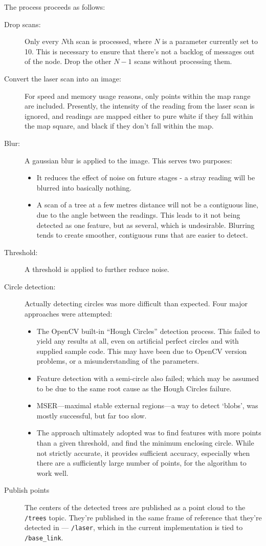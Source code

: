 \documentclass[12pt,oneside,a4paper]{book}
\begin{document}
The process proceeds as follows:
\begin{description}
\item[Drop scans:] Only every $N$th scan is processed, where $N$ is a
  parameter currently set to 10. This is necessary to ensure that
  there's not a backlog of messages out of the node. Drop the other
  $N-1$ scans without processing them.
\item[Convert the laser scan into an image:] For speed and memory usage
  reasons, only points within the map range are included. Presently,
  the intensity of the reading from the laser scan is ignored, and
  readings are mapped either to pure white if they fall within the map
  square, and black if they don't fall within the map.
\item[Blur:] A gaussian blur is applied to the image. This serves two
  purposes:
  \begin{itemize}
  \item It reduces the effect of noise on future stages - a stray
    reading will be blurred into basically nothing.
  \item A scan of a tree at a few metres distance will not be a
    contiguous line, due to the angle between the readings. This leads
    to it not being detected as one feature, but as several, which is
    undesirable. Blurring tends to create smoother, contiguous runs
    that are easier to detect.
  \end{itemize}
\item[Threshold:] A threshold is applied to further reduce noise.
\item[Circle detection:] Actually detecting circles was more difficult
  than expected. Four major approaches were attempted:
  \begin{itemize}
  \item The OpenCV built-in ``Hough Circles'' detection process. This
    failed to yield any results at all, even on artificial perfect
    circles and with supplied sample code. This may have been due to
    OpenCV version problems, or a misunderstanding of the parameters.
  \item Feature detection with a semi-circle also failed; which may be
    assumed to be due to the same root cause as the Hough Circles
    failure.
  \item MSER---maximal stable external regions---a way to detect
    `blobs', was mostly successful, but far too slow.
  \item The approach ultimately adopted was to find features with more
    points than a given threshold, and find the minimum enclosing
    circle. While not strictly accurate, it provides sufficient
    accuracy, especially when there are a sufficiently large number of
    points, for the algorithm to work well.
  \end{itemize}
\item[Publish points] The centers of the detected trees are published
  as a point cloud to the \texttt{/trees} topic. They're published in
  the same frame of reference that they're detected in ---
  \texttt{/laser}, which in the current implementation is tied to
  \texttt{/base\_link}.
\end{description}
\end{document}

